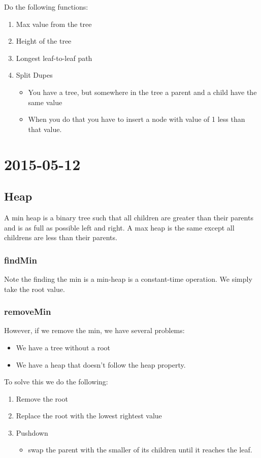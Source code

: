 \documentclass [12 pt, twoside] {article}
\begin{document}
Do the following functions:
\begin{enumerate}
    \item Max value from the tree
    \item Height of the tree
    \item Longest leaf-to-leaf path
    \item Split Dupes
    \begin{itemize}
        \item You have a tree, but somewhere in the tree a parent and a child
            have the same value
        \item When you do that you have to insert a node with value of 1 less
            than that value.
    \end{itemize}
\end{enumerate}

\section{2015-05-12}
\subsection{Heap}
A min heap is a binary tree such that all children are greater than their
parents and is as full as possible left and right. A max heap is the same except
all childrens are less than their parents.

\subsubsection{findMin}
Note the finding the min is a min-heap is a constant-time operation. We simply
take the root value.

\subsubsection{removeMin}
However, if we remove the min, we have several problems:
\begin{itemize}
    \item We have a tree without a root
    \item We have a heap that doesn't follow the heap property.
\end{itemize}

To solve this we do the following:
\begin{enumerate}
    \item Remove the root
    \item Replace the root with the lowest rightest value
    \item Pushdown
    \begin{itemize}
        \item swap the parent with the smaller of its children until it reaches
            the leaf.
    \end{itemize}
\end{enumerate}
    
\end{document}
